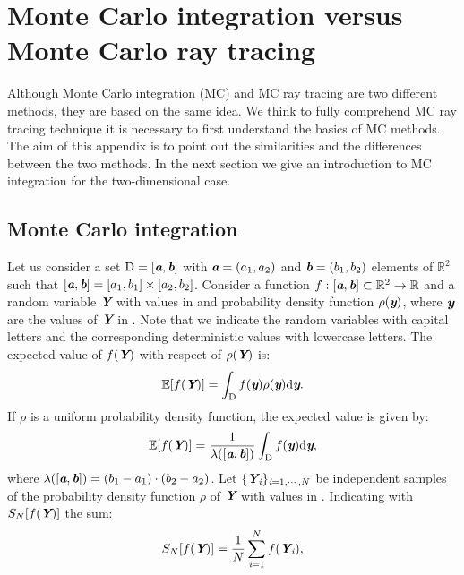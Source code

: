 \chapter{Monte Carlo integration versus Monte Carlo ray tracing}\label{chap:appraytracing}
Although Monte Carlo integration (MC) and MC ray tracing are two different methods, they are based on the same idea. We think to fully comprehend MC ray tracing technique it is necessary to first understand the basics of MC methods. The aim of this appendix is to point out the similarities and the differences between the two methods. In the next section we give an introduction to MC integration for the two-dimensional case. 
\section{Monte Carlo integration}
Let us consider a set $\mbox{$\textup{D}$} = [\textit{\textbf{a}}, \textit{\textbf{b}}]$ with $\textit{\textbf{a}} = (a_1, a_2)$ and $\textit{\textbf{b}} = (b_1, b_2)$ elements of $\mathbb{R}^2$ such that
$[\textit{\textbf{a}}, \textit{\textbf{b}}]  = [a_1, b_1] \times [a_2, b_2]$. Consider a function $f:[\textit{\textbf{a}},\textit{\textbf{b}}]\subset \mathbb{R}^2 \rightarrow \mathbb{R}$ and a random variable $\textit{\textbf{Y}}$ with values in  and probability density function $\rho(\textit{\textbf{y}})$, where $\textit{\textbf{y}}$ are the values of $\textit{\textbf{Y}}$ in . Note that we indicate the random variables with capital letters and the corresponding deterministic values with lowercase letters. The expected value of $f(\textit{\textbf{Y}})$ with respect of $\rho(\textit{\textbf{Y}})$ is:
\begin{equation}
\mathbb{E}[f(\textit{\textbf{Y}})] =\int_{\textup{D}}f(\textit{\textbf{y}})\rho(\textit{\textbf{y}}) \textrm{d}\textit{\textbf{y}}.
\end{equation}
If $\rho$ is a uniform probability density function, the expected value is given by:
\begin{equation}\label{eq:expected_value}
\mathbb{E}[f(\textit{\textbf{Y}})] =\frac{1}{\lambda([\textit{\textbf{a}},\textit{\textbf{b}}])} \int_{\textup{D}}f(\textit{\textbf{y}}) \textrm{d}\textit{\textbf{y}},
\end{equation}
where $\lambda([\textit{\textbf{a}},\textit{\textbf{b}}]) = (b_1-a_1)\cdot(b_2-a_2)$.
Let $\{\textit{\textbf{Y}}_{\textit{i}}\}_{\textit{i} = 1, \cdots, N}$ be independent samples of the probability density function $\rho$ of $\textit{\textbf{Y}}$ with values in .
Indicating with $S_{N}[f(\textit{\textbf{Y}})]$ the sum: 
\begin{equation}
S_{N}[f(\textit{\textbf{Y}})] = \frac{1}{N} \sum_{\textit{i}=1}^{N} f(\textit{\textbf{Y}}_{\textit{i}}),
\end{equation}
